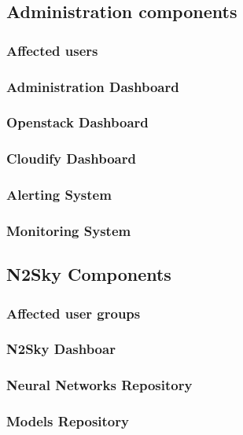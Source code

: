 \subsection{Administration components}\label{Administration components}
\subsubsection{Affected users}\label{Affected users}
\subsubsection{Administration Dashboard}\label{Administration Dashboard}
\subsubsection{Openstack Dashboard}\label{Openstack Dashboard}
\subsubsection{Cloudify Dashboard}\label{Cloudify Dashboard}
\subsubsection{Alerting System}\label{Alerting System}
\subsubsection{Monitoring System}\label{Monitoring System}

\subsection{N2Sky Components}\label{N2Sky Components}
\subsubsection{Affected user groups}\label{Affected user groups 2}
\subsubsection{N2Sky Dashboar}\label{N2Sky Dashboar}
\subsubsection{Neural Networks Repository}\label{Neural Networks Repository}
\subsubsection{Models Repository}\label{Models Repository}
